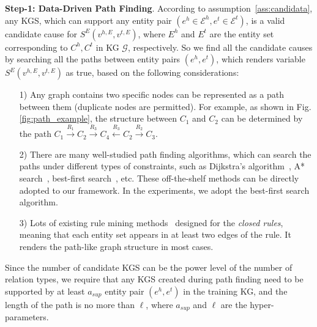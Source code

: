 \noindent
\textbf{Step-1: Data-Driven Path Finding}.
According to assumption~\ref{ass:candidata}, any KGS, which can support any entity pair $(e^h \in \mathcal{E}^h, e^t \in \mathcal{E}^t)$, is a valid candidate cause for $S^{E}(v^{h,E},v^{t,E})$, where $E^h$ and $E^t$ are the entity set corresponding to $C^h,C^t$ in KG $\mathcal{G}$, respectively.
So we find all the candidate causes by searching all the paths between entity pairs $(e^h, e^t)$, which renders variable $S^{E}(v^{h,E},v^{t,E})$ as true, based on the following considerations:
\begin{itemize}
\item[1)] Any graph contains two specific nodes can be represented as a path between them (duplicate nodes are permitted).
For example, as shown in Fig.\ref{fig:path_example}, the structure between $C_1$ and $C_2$ can be determined by the path $C_1 \stackrel{R_1}{\longrightarrow} C_2 \stackrel{R_3}{\longrightarrow} C_4 \stackrel{R_3}{\longleftarrow} C_2 \stackrel{R_2}{\longrightarrow} C_3$.

\item[2)]  There are many well-studied path finding algorithms, which can search the paths under different types of constraints, such as Dijkstra’s algorithm~\cite{lanning2014dijkstra}, A* search~\cite{cui2011based}, best-first search~\cite{heusner2018best}, etc.
These off-the-shelf methods can be directly adopted to our framework.
In the experiments, we adopt the best-first search algorithm.

\item[3)] Lots of existing rule mining methods~\cite{sadeghian2019drum,yang2017differentiable,ho2018rule} designed for the \textit{closed rules}, meaning that each entity set appears in at least two edges of the rule.
It renders the path-like graph structure in most cases.
\end{itemize}
\vspace{-2pt}
Since the number of candidate KGS can be the power level of the number of relation types, we require that any KGS created during path finding need to be supported by at least $a_{sup}$ entity pair $(e^h,e^t)$ in the training KG, and the length of the path is no more than $\ell$, where $a_{sup}$ and $\ell$ are the hyper-parameters.

